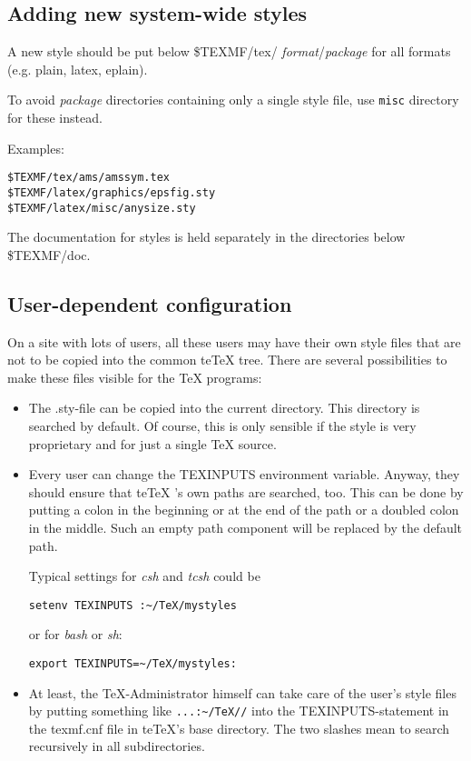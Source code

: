 \documentclass[12pt,a4paper]{article}
\newcommand{\teTeX}{\textrm{te}\TeX\xspace}
\begin{document}
\subsection{Adding new system-wide styles}
\label{ssec:ads}

A new style should be put below {\ttfamily \$TEXMF/tex/{\it
    format}/{\it package}} for all formats (e.g. plain,
latex, eplain).

To avoid {\it package} directories containing only a single
style file, use {\tt misc} directory for these instead.

Examples:

\begin{verbatim}
$TEXMF/tex/ams/amssym.tex
$TEXMF/latex/graphics/epsfig.sty
$TEXMF/latex/misc/anysize.sty
\end{verbatim}

The documentation for styles is held separately in the
directories below {\ttfamily \$TEXMF/doc}.

\subsection{User-dependent configuration}
\label{ssec:use}

On a site with lots of users, all these users may have their
own style files that are not to be copied into the common
\teTeX{} tree. There are several possibilities to make these
files visible for the \TeX{} programs:

\begin{itemize}
\item The {\ttfamily .sty}-file can be copied into the
  current directory.  This directory is searched by default.
  Of course, this is only sensible if the style is very
  proprietary and for just a single \TeX{} source.
  
\item Every user can change the {\ttfamily TEXINPUTS}
  environment variable. Anyway, they should ensure that \teTeX
  's own paths are searched, too. This can be done by putting
  a colon in the beginning or at the end of the path or a
  doubled colon in the middle. Such an empty path component
  will be replaced by the default path.
  
  Typical settings for \emph{csh} and \emph{tcsh} could be
  
  \verb|setenv TEXINPUTS :~/TeX/mystyles|
  
  or for \emph{bash} or \emph{sh}:
  
  \verb|export TEXINPUTS=~/TeX/mystyles:|
  
\item At least, the \TeX -Administrator himself can take care of the
  user's style files by putting something like \verb|...:~/TeX//| into
  the {\ttfamily TEXINPUTS}-statement in the {\ttfamily texmf.cnf}
  file in \teTeX{}'s base directory. The two slashes mean to search
  recursively in all subdirectories.
\end{itemize}
\end{document}
